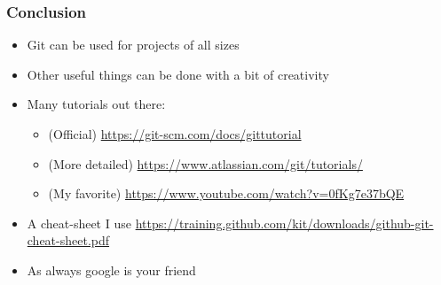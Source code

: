 \documentclass{beamer}
\begin{document}
\begin{frame}
\frametitle{Conclusion}
\begin{itemize}
\item Git can be used for projects of all sizes
\item Other useful things can be done with a bit of creativity
\item Many tutorials out there: 
\begin{itemize}
\item (Official) \url{https://git-scm.com/docs/gittutorial} 
\item (More detailed) \url{https://www.atlassian.com/git/tutorials/}
\item (My favorite) \url{https://www.youtube.com/watch?v=0fKg7e37bQE}
\end{itemize}
\item A cheat-sheet I use \url{https://training.github.com/kit/downloads/github-git-cheat-sheet.pdf}
\item As always google is your friend
\end{itemize}
\end{frame}
\end{document}

